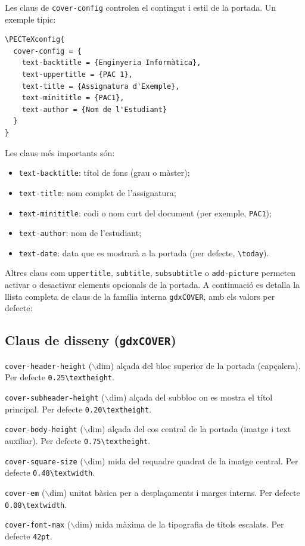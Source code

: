 \documentclass[11pt,a4paper]{article}
\begin{document}
Les claus de \verb|cover-config| controlen el contingut i estil de la
portada. Un exemple típic:
\begin{verbatim}
\PECTeXconfig{
  cover-config = {
    text-backtitle = {Enginyeria Informàtica},
    text-uppertitle = {PAC 1},
    text-title = {Assignatura d'Exemple},
    text-minititle = {PAC1},
    text-author = {Nom de l'Estudiant}
  }
}
\end{verbatim}

Les claus més importants són:
\begin{itemize}
  \item \verb|text-backtitle|: títol de fons (grau o màster);
  \item \verb|text-title|: nom complet de l'assignatura;
  \item \verb|text-minititle|: codi o nom curt del document (per
        exemple, \verb|PAC1|);
  \item \verb|text-author|: nom de l'estudiant;
  \item \verb|text-date|: data que es mostrarà a la portada (per
        defecte, \verb|\today|).
\end{itemize}

Altres claus com \verb|uppertitle|, \verb|subtitle|, \verb|subsubtitle|
o \verb|add-picture| permeten activar o desactivar elements opcionals
de la portada. A continuació es detalla la llista completa de claus
de la família interna \verb|gdxCOVER|, amb els valors per defecte:

\subsection*{Claus de disseny (\texttt{gdxCOVER})}

\begin{description}
  \item{\verb|cover-header-height| ($\backslash$dim)} alçada del bloc superior de la
    portada (capçalera). Per defecte \verb|0.25\textheight|.
  \item{\verb|cover-subheader-height| ($\backslash$dim)} alçada del subbloc on es
    mostra el títol principal. Per defecte \verb|0.20\textheight|.
  \item{\verb|cover-body-height| ($\backslash$dim)} alçada del cos central de la
    portada (imatge i text auxiliar). Per defecte
    \verb|0.75\textheight|.
  \item{\verb|cover-square-size| ($\backslash$dim)} mida del requadre quadrat de la
    imatge central. Per defecte \verb|0.48\textwidth|.
  \item{\verb|cover-em| ($\backslash$dim)} unitat bàsica per a desplaçaments i
    marges interns. Per defecte \verb|0.08\textwidth|.
  \item{\verb|cover-font-max| ($\backslash$dim)} mida màxima de la tipografia de
    títols escalats. Per defecte \verb|42pt|.
\end{description}
\end{document}
